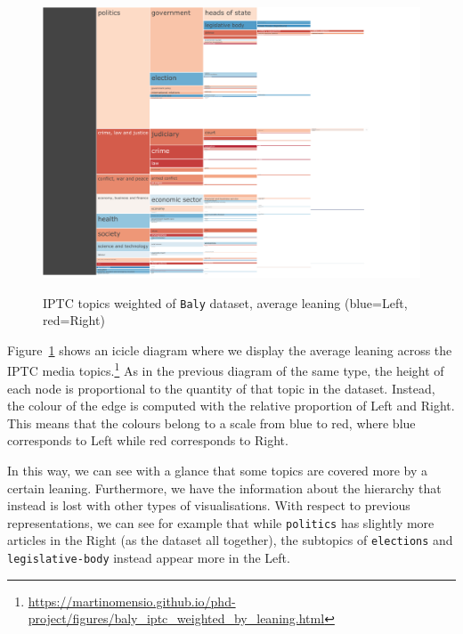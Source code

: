 \begin{figure}[!htbp]
    \centering
    \href{https://martinomensio.github.io/phd-project/figures/baly_iptc_weighted_by_leaning.html}{\includegraphics[trim={2.65cm 0cm 2.8cm 0cm},clip,width=\linewidth]{figures/baly_iptc_weighted_by_leaning.pdf}}
    \caption{IPTC topics weighted of \texttt{Baly} dataset, average leaning (blue=Left, red=Right)}
    \label{fig:baly_iptc_weighted_by_leaning}
\end{figure}

Figure~\ref{fig:baly_iptc_weighted_by_leaning}
shows an icicle diagram where we display the average leaning across the IPTC media topics.\footnote{\url{https://martinomensio.github.io/phd-project/figures/baly_iptc_weighted_by_leaning.html}}
As in the previous diagram of the same type, the height of each node is proportional to the quantity of that topic in the dataset.
Instead, the colour of the edge is computed with the relative proportion of Left and Right. This means that the colours belong to a scale from blue to red, where blue corresponds to Left while red corresponds to Right.

In this way, we can see with a glance that some topics are covered more by a certain leaning. Furthermore, we have the information about the hierarchy that instead is lost with other types of visualisations.
%
With respect to previous representations, we can see for example that while \texttt{politics} has slightly more articles in the Right (as the dataset all together), the subtopics of \texttt{elections} and \texttt{legislative-body} instead appear more in the Left.

